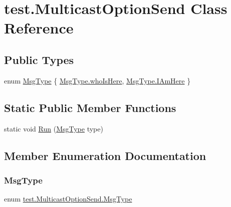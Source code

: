 \hypertarget{classtest_1_1_multicast_option_send}{}\section{test.\+Multicast\+Option\+Send Class Reference}
\label{classtest_1_1_multicast_option_send}
\subsection*{Public Types}
\begin{DoxyCompactItemize}
\item 
enum \hyperlink{classtest_1_1_multicast_option_send_ad66e35012ae287ea4f07de3c6181234f}{Msg\+Type} \{ \hyperlink{classtest_1_1_multicast_option_send_ad66e35012ae287ea4f07de3c6181234fa92b2667a4ba1b9584d35efe223a26520}{Msg\+Type.\+who\+Is\+Here}, 
\hyperlink{classtest_1_1_multicast_option_send_ad66e35012ae287ea4f07de3c6181234fa7e2453cc0d851308ed7af1e6b51689af}{Msg\+Type.\+I\+Am\+Here}
 \}
\end{DoxyCompactItemize}
\subsection*{Static Public Member Functions}
\begin{DoxyCompactItemize}
\item 
static void \hyperlink{classtest_1_1_multicast_option_send_aa893ea8a4f4cd7630ca6248d73c384d6}{Run} (\hyperlink{classtest_1_1_multicast_option_send_ad66e35012ae287ea4f07de3c6181234f}{Msg\+Type} type)
\end{DoxyCompactItemize}


\subsection{Member Enumeration Documentation}
\mbox{\label{classtest_1_1_multicast_option_send_ad66e35012ae287ea4f07de3c6181234f}} 
\subsubsection{\texorpdfstring{Msg\+Type}{MsgType}}
{\footnotesize\ttfamily enum \hyperlink{classtest_1_1_multicast_option_send_ad66e35012ae287ea4f07de3c6181234f}{test.\+Multicast\+Option\+Send.\+Msg\+Type}\hspace{0.3cm}{\ttfamily [strong]}}

